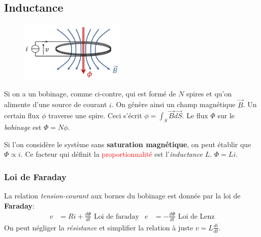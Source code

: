 \documentclass{report}
\begin{document}
\subsection{Inductance}
\begin{figure}
\centering
\includegraphics[width=5cm]{img/bobinage.png}
\end{figure}
Si on a un bobinage, comme ci-contre, qui est formé de $N$ spires et qu'on alimente d'une source de courant $i$. On génère ainsi un champ magnétique $\overrightarrow{B}$. Un certain flux $\phi$ traverse une spire. Ceci s'écrit $\phi = \int_S \overrightarrow{B} \overrightarrow{dS}$. Le flux $\Phi$ sur le \textit{bobinage} est $\Phi = N \phi$.\par
Si l'on considère le système sans \textbf{saturation magnétique}, on peut établir que $\Phi \propto i$. Ce facteur qui définit la \textcolor{red}{proportionnalité} est l'\textit{inductance} $L$. $\Phi = L i$.

\subsubsection{Loi de Faraday} 
La relation \textit{tension-courant} aux bornes du bobinage est donnée par la loi de \textbf{Faraday}:
\begin{align*}
v &= Ri + \frac{d\Phi}{dt} \text{ Loi de faraday} & e &= - \frac{d \Phi}{dt} \text{ Loi de Lenz}
\end{align*}
On peut négliger la \textit{résistance} et simplifier la relation à juste $v = L \frac{di}{dt}$.
\end{document}
